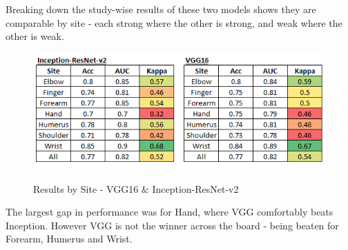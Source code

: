 \documentclass[11pt]{article} %
\theoremstyle{plain}
\theoremstyle{definition}
\begin{document}
\\
\\
\noindent
Breaking down the study-wise results of these two models shows they are comparable by site - each strong where the other is strong, and weak where the other is weak.
\begin{figure}[!ht]
\centering
\includegraphics[scale=0.8]{studywise_final.PNG}
\label{fig:studywise_final}
\caption{Results by Site - VGG16 \& Inception-ResNet-v2}
\end{figure}
\FloatBarrier
\noindent
The largest gap in performance was for Hand, where VGG comfortably beats Inception. However VGG is not the winner across the board - being beaten for Forearm, Humerus and Wrist.


\newpage
\end{document}

